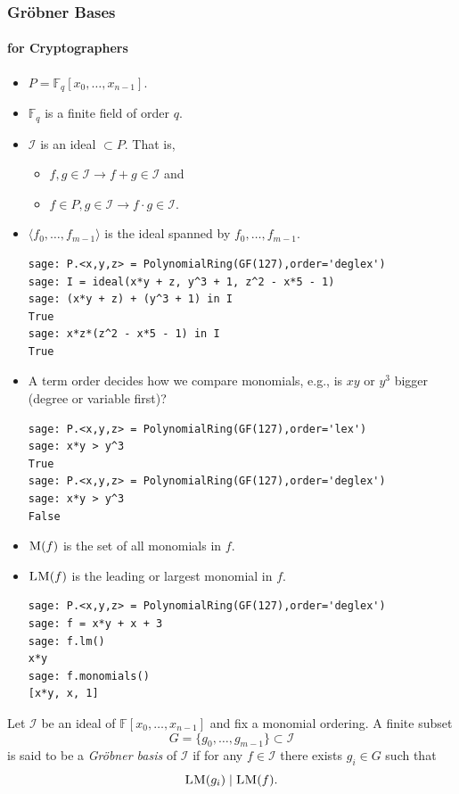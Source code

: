 \documentclass[9pt]{beamer}
\newcommand{\field}[1]{\mathbb{#1}}
\newcommand{\ideal}[1]{\langle #1 \rangle}
\newcommand{\M}[1]{\ensuremath{\textsc{M}(#1)\xspace}}
\newcommand{\LM}[1]{\ensuremath{\textsc{LM}(#1)\xspace}}
\begin{document}
\begin{frame}
\frametitle{Gröbner Bases}
\framesubtitle{for Cryptographers} 

\begin{itemize}
 \item $P = \field{F}_q[x_0,\dots,x_{n-1}]$.
 \item $\field{F}_q$ is a finite field of order $q$.
 \item $\mathcal{I}$ is an ideal $ \subset P$. That is, 
  \begin{itemize}
  \item $f,g \in \mathcal{I} \longrightarrow f + g \in \mathcal{I}$ and 
  \item $f \in P, g \in \mathcal{I} \longrightarrow f \cdot g \in \mathcal{I}.$
  \end{itemize}
 
 \item $\ideal{f_0,\dots,f_{m-1}}$ is the ideal spanned by $f_0,\dots,f_{m-1}$.
\begin{lstlisting}
sage: P.<x,y,z> = PolynomialRing(GF(127),order='deglex')
sage: I = ideal(x*y + z, y^3 + 1, z^2 - x*5 - 1)
sage: (x*y + z) + (y^3 + 1) in I
True
sage: x*z*(z^2 - x*5 - 1) in I
True
\end{lstlisting}
\framebreak 
 \item A term order decides how we compare monomials, e.g., is $xy$ or $y^3$ bigger (degree or variable first)?
\begin{lstlisting}
sage: P.<x,y,z> = PolynomialRing(GF(127),order='lex')
sage: x*y > y^3
True
sage: P.<x,y,z> = PolynomialRing(GF(127),order='deglex')
sage: x*y > y^3
False
\end{lstlisting}
 \item $\M{f}$ is the set of all monomials in $f$.
 \item $\LM{f}$ is the leading or largest monomial in $f$.
\begin{lstlisting}
sage: P.<x,y,z> = PolynomialRing(GF(127),order='deglex')
sage: f = x*y + x + 3
sage: f.lm()
x*y
sage: f.monomials()
[x*y, x, 1]
\end{lstlisting}
\end{itemize}

\framebreak

\begin{definition}
Let $\mathcal{I}$ be an ideal of $\field{F}[x_0,\dots,x_{n-1}]$ and fix a monomial ordering. A finite subset $$G = \{g_0 ,\dots , g_{m-1} \} \subset \mathcal{I}$$  is said to be a \emph{Gr\"obner basis} of $\mathcal{I}$ if for any $f \in \mathcal{I}$ there exists $g_i \in G$ such that $$\LM{g_i} \mid \LM{f}.$$
\end{definition}


\end{frame}
\end{document}
